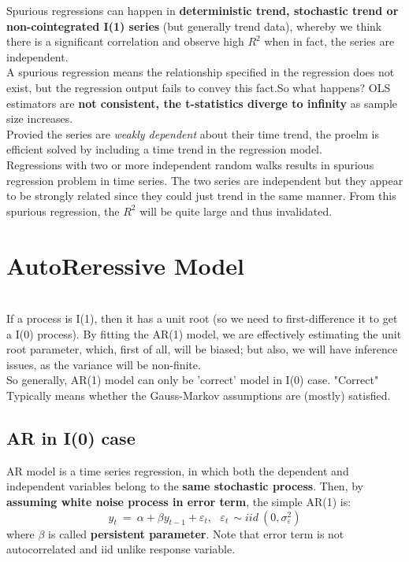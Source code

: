\documentclass[12pt]{article}
\begin{document}
Spurious regressions can happen in \textbf{deterministic trend, stochastic trend or non-cointegrated I(1) series} (but generally trend data), whereby we think there is a significant correlation and observe high $R^2$ when in fact, the series are independent.
\\ 

A spurious regression means the relationship specified in the regression does not exist, but the regression output fails to convey this fact.So what happens? OLS estimators are \textbf{not consistent, the t-statistics diverge to infinity} as sample size increases.
\\

Provied the series are \textit{weakly dependent} about their time trend, the proelm is efficient solved by including a time trend in the regression model. 
\\

Regressions with two or more independent random walks results in spurious regression problem in time series. The two series are independent but they appear to be strongly related since they could just trend in the same manner. From this spurious regression, the $R^2$ will be quite large and thus invalidated.




\newpage
{\color{RoyalBlue}
\section{AutoReressive Model}}
\noindent
\color{purple} 
\\

\color{black}
If a process is I(1), then it has a unit root (so we need to first-difference it to get a I(0) process). By fitting the AR(1) model, we are effectively estimating the unit root parameter, which, first of all, will be biased; but also, we will have inference issues, as the variance will be non-finite.
\\

So generally, AR(1) model can only be 'correct' model in I(0) case. "Correct" Typically means whether the Gauss-Markov assumptions are (mostly)  satisfied. 

\newpage
{\color{RoyalBlue}
\subsection{AR in I(0) case}}
AR model is a time series regression, in which both the dependent and independent variables belong to the \textbf{same stochastic process}. Then, by \textbf{assuming white noise process in error term}, the simple AR(1) is: 
$$y_t\ =\ \alpha+\beta y_{t-1}+\varepsilon_t,\ \ \ \varepsilon_{t\ }\sim iid\ \left(0,\sigma_{\varepsilon}^2\right)$$
where $\beta$ is called \textbf{persistent parameter}. Note that error term is not autocorrelated and iid unlike response variable. 
\\
\end{document}
